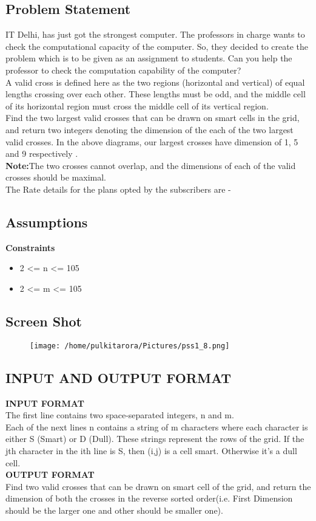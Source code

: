\documentclass[a4paper,12pt]{article}
\begin{document}
\subsection{Problem Statement}
{
IT Delhi, has just got the strongest computer. The professors in charge wants to check the computational capacity of the computer. So, they decided to create the problem which is to be given as an assignment to students. Can you help the professor to check the computation capability of the computer?\\
A valid cross is defined here as the two regions (horizontal and vertical) of equal lengths crossing over each other. These lengths must be odd, and the middle cell of its horizontal region must cross the middle cell of its vertical region.
\\
Find the two largest valid crosses that can be drawn on smart cells in the grid, and return two integers denoting the dimension of the each of the two largest valid crosses. In the above diagrams, our largest crosses have dimension of 1,  5 and 9 respectively .\\
\textbf{Note:}The two crosses cannot overlap, and the dimensions of each of the valid crosses should be maximal.\\
The Rate details for the plans opted by the subscribers are -
\subsection{Assumptions}
  \textbf{Constraints}
   \begin{itemize}
   \item 2 <= n <= 105
   \item 2 <= m <= 105
   \end{itemize}

\newpage
\subsection{Screen Shot}
{
\begin{figure}[h]
\texttt{[image: /home/pulkitarora/Pictures/pss1\_8.png]}
\end{figure}
}
\subsection{INPUT AND OUTPUT FORMAT}
\textbf{INPUT FORMAT}\\
 The first line contains two space-separated integers,  n and m. \\
   Each of the next  lines n contains a string of  m characters where each character is either S (Smart) or D (Dull). These strings represent the rows of the grid. If the jth character in the ith  line is S, then  (i,j) is a  cell smart. Otherwise it's a  dull cell.\\  
\textbf{OUTPUT FORMAT}\\
   Find two valid crosses that can be drawn on smart cell of the grid, and return the dimension of both the crosses in the reverse sorted order(i.e. First Dimension should be the larger one and other should be smaller one).\\
   
}
\end{document}
